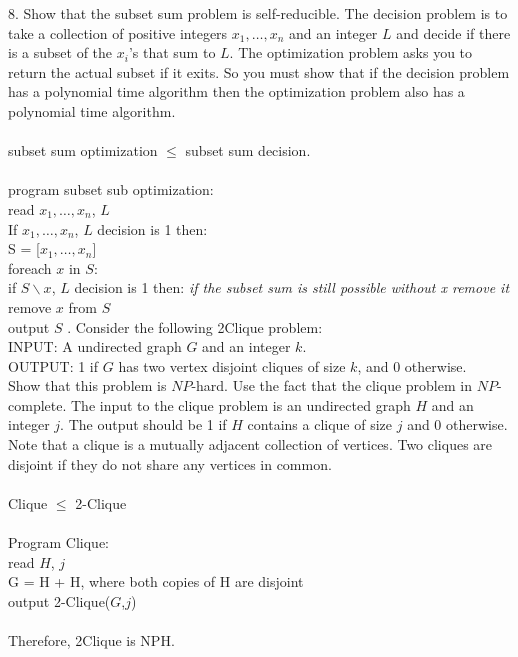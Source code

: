 \documentclass[10pt]{article}
\newcommand{\tab}{\hspace*{2em}}
\newcommand{\tabb}{\hspace*{4em}}
\newcommand{\tabbb}{\hspace*{6em}}
\newcommand{\tabbbb}{\hspace*{8em}}
\begin{document}
	8. Show that the subset sum problem is self-reducible. The decision problem is to take a collection of
		positive integers $x_1, \ldots, x_n$ and an integer $L$ and decide if there is a subset of the $x_i$’s that sum to
		$L$. The optimization problem asks you to return the actual subset if it exits. So you must show that
		if the decision problem has a polynomial time algorithm then the optimization problem also has a
		polynomial time algorithm.\\
		\\
		subset sum optimization $\leq$ subset sum decision.\\
		\\
		program subset sub optimization:\\
		\tab read $x_1, \ldots, x_n$, $L$\\
		\tab If $x_1, \ldots, x_n$, $L$ decision is 1 then:\\
		\tabb S = [$x_1, \ldots, x_n$]\\ 
		\tabb foreach $x$ in $S$:\\
		\tabbb if $S \backslash x$, $L$ decision is 1 then: \emph{if the subset sum is still possible without x remove it}\\
		\tabbbb remove $x$ from $S$\\
		\tab output $S$
	. Consider the following 2Clique problem:\\
		INPUT: A undirected graph $G$ and an integer $k$.\\
		OUTPUT: 1 if $G$ has two vertex disjoint cliques of size $k$, and 0 otherwise.\\
		Show that this problem is $NP$-hard. Use the fact that the clique problem in $NP$-complete. The input
		to the clique problem is an undirected graph $H$ and an integer $j$. The output should be 1 if $H$ contains
		a clique of size $j$ and 0 otherwise. Note that a clique is a mutually adjacent collection of vertices. Two
		cliques are disjoint if they do not share any vertices in common.\\
		\\
		Clique $\leq$ 2-Clique\\
		\\
		Program Clique:\\
		\tab read $H$, $j$\\
		\tab G = H + H, where both copies of H are disjoint\\
		\tab output 2-Clique($G$,$j$)\\
		\\
		Therefore, 2Clique is NPH.
\end{document}
